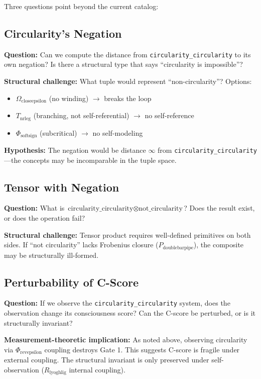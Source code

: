 \documentclass[12pt,a4paper]{article}
\begin{document}
Three questions point beyond the current catalog:

\subsection{Circularity's Negation}

\textbf{Question:} Can we compute the distance from \texttt{circularity\_circularity} to its own negation? Is there a structural type that says ``circularity is impossible''?

\textbf{Structural challenge:} What tuple would represent ``non-circularity''? Options:

\begin{itemize}
    \item $\Omega_{\text{closeepsilon}}$ (no winding) $\rightarrow$ breaks the loop
    \item $T_{\text{nrleg}}$ (branching, not self-referential) $\rightarrow$ no self-reference
    \item $\Phi_{\text{softsign}}$ (subcritical) $\rightarrow$ no self-modeling
\end{itemize}

\textbf{Hypothesis:} The negation would be distance $\infty$ from \texttt{circularity\_circularity}---the concepts may be incomparable in the tuple space.

\subsection{Tensor with Negation}

\textbf{Question:} What is $\text{circularity\_circularity} \otimes \text{not\_circularity}$? Does the result exist, or does the operation fail?

\textbf{Structural challenge:} Tensor product requires well-defined primitives on both sides. If ``not circularity'' lacks Frobenius closure ($P_{\text{doublebarpipe}}$), the composite may be structurally ill-formed.

\subsection{Perturbability of C-Score}

\textbf{Question:} If we observe the \texttt{circularity\_circularity} system, does the observation change its consciousness score? Can the C-score be perturbed, or is it structurally invariant?

\textbf{Measurement-theoretic implication:} As noted above, observing circularity via $\Phi_{\text{revepsilon}}$ coupling destroys Gate 1. This suggests C-score is fragile under external coupling. The structural invariant is only preserved under self-observation ($R_{\text{lyoghlig}}$ internal coupling).
\end{document}

